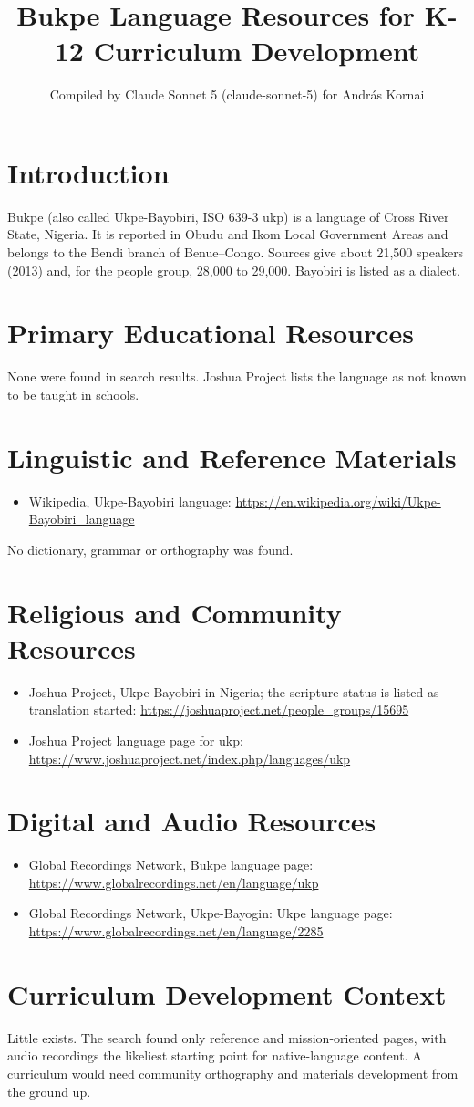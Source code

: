 \documentclass[12pt]{article}
\title{Bukpe Language Resources for K-12 Curriculum Development}
\author{Compiled by Claude Sonnet 5 (claude-sonnet-5) for Andr\'as Kornai}
\date{}
\begin{document}
\maketitle
\section{Introduction}
Bukpe (also called Ukpe-Bayobiri, ISO 639-3 ukp) is a language of Cross River State, Nigeria. It is reported in Obudu and Ikom Local Government Areas and belongs to the Bendi branch of Benue--Congo. Sources give about 21,500 speakers (2013) and, for the people group, 28,000 to 29,000. Bayobiri is listed as a dialect.
\section{Primary Educational Resources}
None were found in search results. Joshua Project lists the language as not known to be taught in schools.
\section{Linguistic and Reference Materials}
\begin{itemize}
\item Wikipedia, Ukpe-Bayobiri language: \url{https://en.wikipedia.org/wiki/Ukpe-Bayobiri_language}
\end{itemize}
No dictionary, grammar or orthography was found.
\section{Religious and Community Resources}
\begin{itemize}
\item Joshua Project, Ukpe-Bayobiri in Nigeria; the scripture status is listed as translation started: \url{https://joshuaproject.net/people_groups/15695}
\item Joshua Project language page for ukp: \url{https://www.joshuaproject.net/index.php/languages/ukp}
\end{itemize}
\section{Digital and Audio Resources}
\begin{itemize}
\item Global Recordings Network, Bukpe language page: \url{https://www.globalrecordings.net/en/language/ukp}
\item Global Recordings Network, Ukpe-Bayogin: Ukpe language page: \url{https://www.globalrecordings.net/en/language/2285}
\end{itemize}
\section{Curriculum Development Context}
Little exists. The search found only reference and mission-oriented pages, with audio recordings the likeliest starting point for native-language content. A curriculum would need community orthography and materials development from the ground up.
\end{document}
